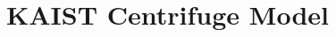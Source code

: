 \documentclass[a4paper, nobind]{templates/ociamthesis}
\begin{document}
\begin{romanpages}

\maketitle




%	

  \dominitoc %

\flushbottom

\tableofcontents



\end{romanpages}

\flushbottom

\minitoc

\newpage

\hypertarget{kaist-centrifuge-model}{%
\chapter{KAIST Centrifuge Model}\label{kaist-centrifuge-model}}
\end{document}
